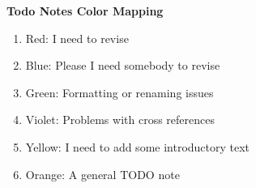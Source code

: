 \newpage

\textbf{Todo Notes Color Mapping}

\begin{enumerate}
    \item {} Red: I need to revise 
    \item {} Blue: Please I need somebody to revise
    \item {} Green: Formatting or renaming issues
    \item {} Violet: Problems with cross references
    \item {} Yellow: I need to add some introductory text
    \item {} Orange: A general TODO note
    
\end{enumerate}


\listoftodos[Notes]
